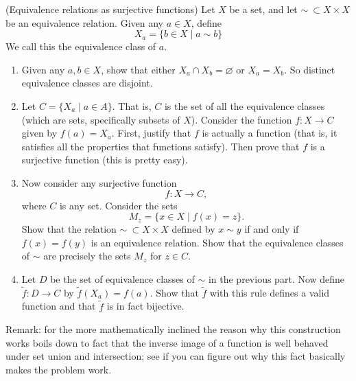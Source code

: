 (Equivalence relations as surjective functions) Let $X$ be a set, and let $\sim~\subset X \times X$ be an equivalence relation. Given any $a \in X$, define
\[X_a = \{b \in X \mid a\sim  b\}\]
We call this the equivalence class of $a$.

\begin{enumerate}
    \item Given any $a, b \in X$, show that either $X_a \cap X_b = \varnothing$ or $X_a = X_b$. So distinct equivalence classes are disjoint.
    \item Let $C = \{X_a \mid a \in A\}$. That is, $C$ is the set of all the equivalence classes (which are sets, specifically subsets of $X$). Consider the function $f:X \to C$ given by $f(a) = X_a$. First, justify that $f$ is actually a function (that is, it satisfies all the properties that functions satisfy). Then prove that $f$ is a surjective function (this is pretty easy).
    \item Now consider any surjective function
    \[f:X \to C,\] where $C$ is any set. Consider the sets 
    \[M_z = \{x \in X \mid f(x) = z\}.\]
    Show that the relation $\sim~\subset X \times X$ defined by $x \sim y$ if and only if $f(x) = f(y)$ is an equivalence relation. Show that the equivalence classes of $\sim$ are precisely the sets $M_z$ for $z \in C$.
    \item Let $D$ be the set of equivalence classes of $\sim$ in the previous part. Now define $\tilde{f}: D \to C$ by $\tilde{f}(X_a) = f(a)$.
    Show that $\tilde{f}$ with this rule defines a valid function and that $\tilde{f}$ is in fact bijective.
\end{enumerate}
Remark: for the more mathematically inclined the reason why this construction works boils down to fact that the inverse image of a function is well behaved under set union and intersection; see if you can figure out why this fact basically makes the problem work.